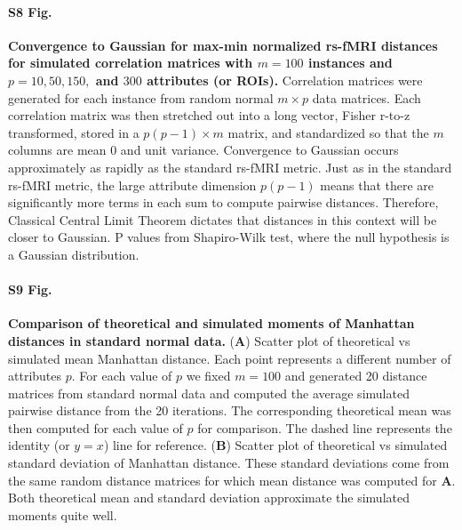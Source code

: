 \documentclass[10pt,letterpaper]{article}
\begin{document}
\paragraph*{S8 Fig.}
\label{S8_Fig}
{\bf Convergence to Gaussian for max-min normalized rs-fMRI distances for simulated correlation matrices with $m=100$ instances and $p=10, 50, 150,$ and $300$ attributes (or ROIs).} Correlation matrices were generated for each instance from random normal $m \times p$ data matrices. Each correlation matrix was then stretched out into a long vector, Fisher r-to-z transformed, stored in a $p(p-1) \times m$ matrix, and standardized so that the $m$ columns are mean 0 and unit variance. Convergence to Gaussian occurs approximately as rapidly as the standard rs-fMRI metric. Just as in the standard rs-fMRI metric, the large attribute dimension $p(p-1)$ means that there are significantly more terms in each sum to compute pairwise distances. Therefore, Classical Central Limit Theorem dictates that distances in this context will be closer to Gaussian. P values from Shapiro-Wilk test, where the null hypothesis is a Gaussian distribution.

\paragraph*{S9 Fig.}
\label{S9_Fig}
{\bf Comparison of theoretical and simulated moments of Manhattan distances in standard normal data.} (\textbf{A}) Scatter plot of theoretical vs simulated mean Manhattan distance. Each point represents a different number of attributes $p$. For each value of $p$ we fixed $m=100$ and generated 20 distance matrices from standard normal data and computed the average simulated pairwise distance from the 20 iterations. The corresponding theoretical mean was then computed for each value of $p$ for comparison. The dashed line represents the identity (or $y=x$) line for reference. (\textbf{B}) Scatter plot of theoretical vs simulated standard deviation of Manhattan distance. These standard deviations come from the same random distance matrices for which mean distance was computed for \textbf{A}. Both theoretical mean and standard deviation approximate the simulated moments quite well.
\end{document}
